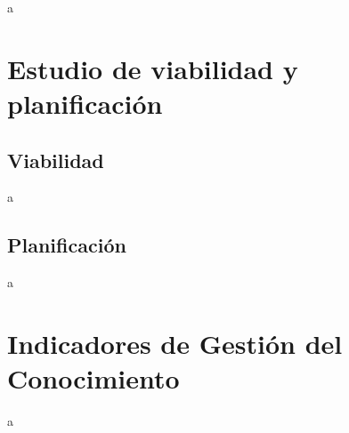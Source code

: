 \documentclass[a4paper]{article}
\begin{document}
a


\section{Estudio de viabilidad y planificación}

\subsection{Viabilidad}

a

\subsection{Planificación}

a

\section{Indicadores de Gestión del Conocimiento}

a
\end{document}
